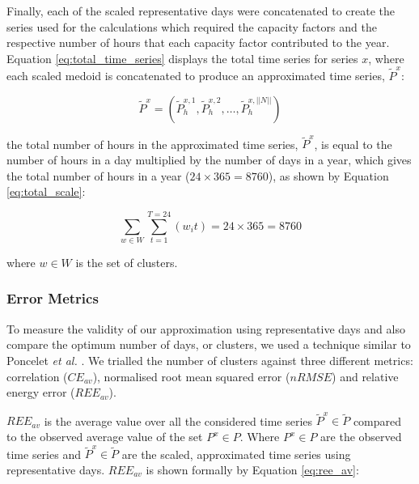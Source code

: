 
Finally, each of the scaled representative days were concatenated to create the series used for the calculations which required the capacity factors and the respective number of hours that each capacity factor contributed to the year. Equation \ref{eq:total_time_series} displays the total time series for series $x$, where each scaled medoid is concatenated to produce an approximated time series, $\widetilde{P}^x$:


\begin{equation}
\label{eq:total_time_series}
\widetilde{P}^x=\left(\widetilde{P}^{x,1}_{h},\widetilde{P}^{x,2}_{h},\ldots, \widetilde{P}^{x,||N||}_{h}\right)
\end{equation}

\noindent the total number of hours in the approximated time series, $\widetilde{P}^x$, is equal to the number of hours in a day multiplied by the number of days in a year, which gives the total number of hours in a year ($24\times 365=8760$), as shown by Equation \ref{eq:total_scale}:


\begin{equation}
\label{eq:total_scale}
\sum\limits_{w\in W}\sum\limits_{t=1}^{T=24}\left(w_i t\right)=24\times 365=8760
\end{equation}

\noindent where $w\in W$ is the set of clusters.

\subsubsection{Error Metrics}

To measure the validity of our approximation using representative days and also compare the optimum number of days, or clusters, we used a technique similar to Poncelet \textit{et al.} \cite{Dhaeseleer2015, Poncelet2017}. We trialled the number of clusters against three different metrics: correlation ($CE_{av}$), normalised root mean squared error ($nRMSE$) and relative energy error ($REE_{av}$). 

$REE_{av}$ is the average value over all the considered time series $\widetilde{P}^x{\in} \widetilde{P}$ compared to the observed average value of the set $P^x\in P$. Where $P^x\in P$ are the observed time series and $\widetilde{P}^x{\in} \widetilde{P}$ are the scaled, approximated time series using representative days. $REE_{av}$ is shown formally by Equation \ref{eq:ree_av}:


